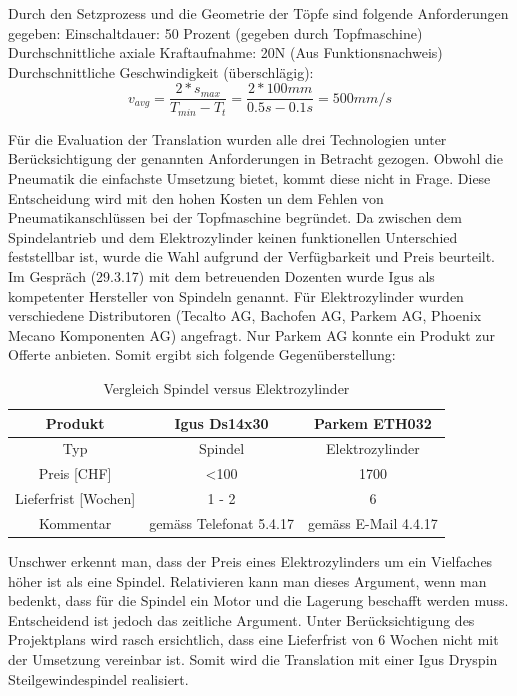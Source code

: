Durch den Setzprozess und die Geometrie der Töpfe sind folgende Anforderungen gegeben:
\newline
Einschaltdauer: 50 Prozent (gegeben durch Topfmaschine)
\newline
Durchschnittliche axiale Kraftaufnahme: 20N (Aus Funktionsnachweis)
\newline
Durchschnittliche Geschwindigkeit (überschlägig):
\begin{equation}
v_{avg}=\frac{2*s_{max}}{T_{min}-T_{t}}=\frac{2*100mm}{0.5s-0.1s}=500mm/s
\end{equation}

Für die Evaluation der Translation wurden alle drei Technologien unter Berücksichtigung der genannten Anforderungen in Betracht gezogen. Obwohl die Pneumatik die einfachste Umsetzung bietet, kommt diese nicht in Frage. Diese Entscheidung wird mit den hohen Kosten un dem Fehlen von Pneumatikanschlüssen bei der Topfmaschine begründet.
\newline
Da zwischen dem Spindelantrieb und dem Elektrozylinder keinen funktionellen Unterschied feststellbar ist, wurde die Wahl aufgrund der Verfügbarkeit und Preis beurteilt. Im Gespräch (29.3.17) mit dem betreuenden Dozenten wurde Igus als kompetenter Hersteller von Spindeln genannt. Für Elektrozylinder wurden verschiedene Distributoren (Tecalto AG, Bachofen AG, Parkem AG, Phoenix Mecano Komponenten AG) angefragt. Nur Parkem AG konnte ein Produkt zur Offerte anbieten. Somit ergibt sich folgende Gegenüberstellung:
\begin{table}[H]
\begin{tabular}{|c|c|c|}
	\hline 
	Produkt & Igus Ds14x30 & Parkem ETH032  \\ 
	\hline 
	Typ & Spindel & Elektrozylinder \\ 
	\hline 
	Preis [CHF] & <100  & 1700    \\ 
	\hline 
	Lieferfrist [Wochen] &1 - 2  &6 \\ 
	\hline 
	Kommentar & gemäss Telefonat 5.4.17 & gemäss E-Mail 4.4.17 \\ 
	\hline 
\end{tabular}
	\vspace{0.2cm}
	\caption{Vergleich Spindel versus Elektrozylinder}
	\label{tab:spindelauslegung}
\end{table}
Unschwer erkennt man, dass der Preis eines Elektrozylinders um ein Vielfaches höher ist als eine Spindel. Relativieren kann man dieses Argument, wenn man bedenkt, dass für die Spindel ein Motor und die Lagerung beschafft werden muss. Entscheidend ist jedoch das zeitliche Argument. Unter Berücksichtigung des Projektplans wird rasch ersichtlich, dass eine Lieferfrist von 6 Wochen nicht mit der Umsetzung vereinbar ist. Somit wird die Translation mit einer Igus Dryspin Steilgewindespindel realisiert.\\

